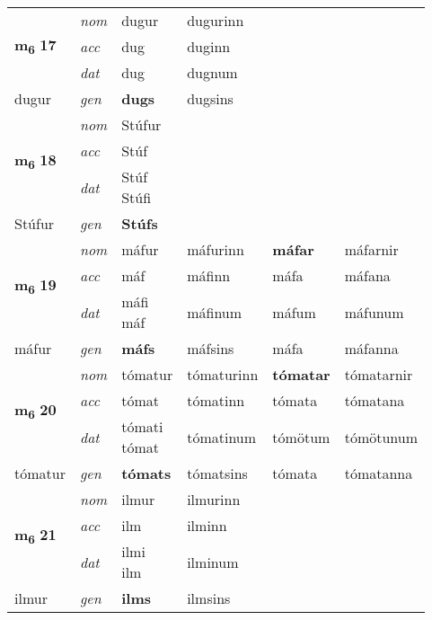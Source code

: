 \begin{longtable}[l]{X>{\footnotesize\itshape}XXXXX}
\multirow{3}{*}{{{\textbf{m{\textsubscript{6}}} \Large{\textbf{17}}}}} & nom & dugur & dugurinn & \textbf{} &  \\*
 & acc & dug & duginn &  &  \\*
 & dat & dug & dugnum &  &  \\*
 {\footnotesize{dugur}} & gen & \textbf{dugs} & dugsins &  &  \\
\cmidrule{1-6}

\multirow{3}{*}{{{\textbf{m{\textsubscript{6}}} \Large{\textbf{18}}}}} & nom & Stúfur &  & \textbf{} &  \\*
 & acc & Stúf &  &  &  \\*
 & dat & \specialcell{Stúf\\ Stúfi} &  &  &  \\*
 {\footnotesize{Stúfur}} & gen & \textbf{Stúfs} &  &  &  \\
\cmidrule{1-6}

\multirow{3}{*}{{{\textbf{m{\textsubscript{6}}} \Large{\textbf{19}}}}} & nom & máfur & máfurinn & \textbf{máfar} & máfarnir \\*
 & acc & máf & máfinn & máfa & máfana \\*
 & dat & \specialcell{máfi\\ máf} & máfinum & máfum & máfunum \\*
 {\footnotesize{máfur}} & gen & \textbf{máfs} & máfsins & máfa & máfanna \\
\cmidrule{1-6}

\multirow{3}{*}{{{\textbf{m{\textsubscript{6}}} \Large{\textbf{20}}}}} & nom & tómatur & tómaturinn & \textbf{tómatar} & tómatarnir \\*
 & acc & tómat & tómatinn & tómata & tómatana \\*
 & dat & \specialcell{tómati\\ tómat} & tómatinum & tómötum & tómötunum \\*
 {\footnotesize{tómatur}} & gen & \textbf{tómats} & tómatsins & tómata & tómatanna \\
\cmidrule{1-6}

\multirow{3}{*}{{{\textbf{m{\textsubscript{6}}} \Large{\textbf{21}}}}} & nom & ilmur & ilmurinn & \textbf{} &  \\*
 & acc & ilm & ilminn &  &  \\*
 & dat & \specialcell{ilmi\\ ilm} & ilminum &  &  \\*
 {\footnotesize{ilmur}} & gen & \textbf{ilms} & ilmsins &  &  \\
\cmidrule{1-6}


\end{longtable}
